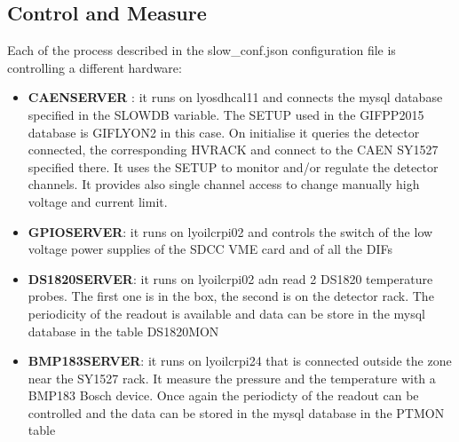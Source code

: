 \documentclass[english]{article}
\begin{document}
\subsection{Control and Measure}
Each of the process described in the slow\_conf.json configuration file is controlling a different hardware:
\begin{itemize}
\item {\bf CAENSERVER }: it runs on lyosdhcal11 and connects the mysql database specified in the SLOWDB variable. The SETUP used in the GIFPP2015 database is GIFLYON2 in this case. On initialise it queries the detector connected, the corresponding HVRACK and connect to the CAEN SY1527 specified there. It uses the SETUP to monitor and/or regulate the detector channels. It provides also single channel access to change manually high voltage and current limit. 

\item {\bf GPIOSERVER}: it runs on lyoilcrpi02 and controls the switch of the low voltage power supplies of the SDCC VME card and of all the DIFs

\item {\bf DS1820SERVER}: it runs on lyoilcrpi02 adn read 2 DS1820 temperature probes. The first one is in the box, the second is on the detector rack. The periodicity of the readout is available and data can be store in the mysql database in the table DS1820MON

\item {\bf BMP183SERVER}: it runs on lyoilcrpi24 that is connected outside the zone near the SY1527 rack. It measure the pressure and the temperature with a BMP183 Bosch device. Once again the periodicty of the readout can be controlled and the data can be stored in the mysql database in the PTMON table
\end{itemize}
\end{document}
